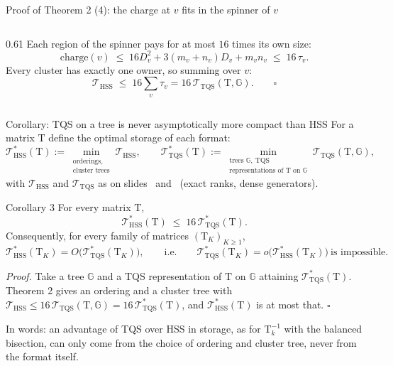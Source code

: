 \documentclass[aspectratio=169,11pt]{beamer}
\begin{document}
\begin{frame}{Proof of Theorem 2 (4): the charge at $v$ fits in the spinner of $v$}
\begin{columns}[c]
\begin{column}{0.61\textwidth}
\vspace{2mm}
\footnotesize
Each region of the spinner pays for at most $16$ times its own size:
\[
\text{charge}(v)\;\leq\;16D_v^2+3(m_v+n_v)D_v+m_vn_v\;\leq\;16\,\tau_v .
\]
Every cluster has exactly one owner, so summing over $v$:
\[
\mathcal{T}_{\mathrm{HSS}}\;\leq\;16\textstyle\sum_v\tau_v=16\,\mathcal{T}_{\mathrm{TQS}}(\mathrm{T},\mathbb{G}).\qquad\square
\]
\end{column}
\end{columns}
\end{frame}

\begin{frame}{Corollary: TQS on a tree is never asymptotically more compact than HSS}
\label{sl:cor3}\hypertarget{sl:cor3}{}
\footnotesize
For a matrix $\mathrm{T}$ define the optimal storage of each format:
\[
\mathcal{T}^{*}_{\mathrm{HSS}}(\mathrm{T}):=\min_{\substack{\text{orderings,}\\\text{cluster trees}}}\mathcal{T}_{\mathrm{HSS}},
\qquad
\mathcal{T}^{*}_{\mathrm{TQS}}(\mathrm{T}):=\min_{\substack{\text{trees }\mathbb{G},\ \text{TQS}\\\text{representations of }\mathrm{T}\text{ on }\mathbb{G}}}
\mathcal{T}_{\mathrm{TQS}}(\mathrm{T},\mathbb{G}),
\]
with $\mathcal{T}_{\mathrm{HSS}}$ and $\mathcal{T}_{\mathrm{TQS}}$ as on slides~\pageref{sl:set1} and~\pageref{sl:set3} (exact ranks, dense
generators).

\vspace{2mm}
\begin{block}{Corollary 3}
For every matrix $\mathrm{T}$,
\[
\mathcal{T}^{*}_{\mathrm{HSS}}(\mathrm{T})\;\leq\;16\,\mathcal{T}^{*}_{\mathrm{TQS}}(\mathrm{T}).
\]
Consequently, for every family of matrices $(\mathrm{T}_K)_{K\geq1}$,
\[
\mathcal{T}^{*}_{\mathrm{HSS}}(\mathrm{T}_K)=O\big(\mathcal{T}^{*}_{\mathrm{TQS}}(\mathrm{T}_K)\big),
\qquad\text{i.e.}\qquad
\mathcal{T}^{*}_{\mathrm{TQS}}(\mathrm{T}_K)=o\big(\mathcal{T}^{*}_{\mathrm{HSS}}(\mathrm{T}_K)\big)\ \text{is impossible.}
\]
\end{block}

\textit{Proof.} Take a tree $\mathbb{G}$ and a TQS representation of $\mathrm{T}$ on $\mathbb{G}$ attaining
$\mathcal{T}^{*}_{\mathrm{TQS}}(\mathrm{T})$. Theorem 2 gives an ordering and a cluster tree with
$\mathcal{T}_{\mathrm{HSS}}\leq16\,\mathcal{T}_{\mathrm{TQS}}(\mathrm{T},\mathbb{G})=16\,\mathcal{T}^{*}_{\mathrm{TQS}}(\mathrm{T})$,
and $\mathcal{T}^{*}_{\mathrm{HSS}}(\mathrm{T})$ is at most that. \hfill$\square$

\vspace{2mm}
In words: an advantage of TQS over HSS in storage, as for $\mathrm{T}_k^{-1}$ with the balanced bisection, can only
come from the choice of ordering and cluster tree, never from the format itself.
\end{frame}
\end{document}
